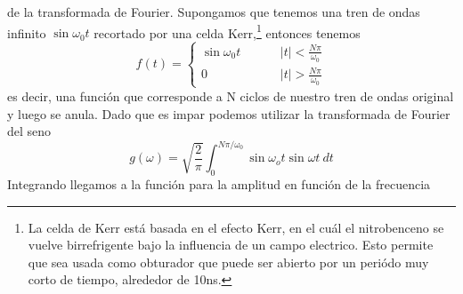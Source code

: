  de la transformada de Fourier. Supongamos que tenemos una tren de ondas infinito $\sin{\omega_0 t}$ recortado por una celda Kerr,\footnote{La celda de Kerr está basada en el efecto Kerr, en el cuál el nitrobenceno se vuelve birrefrigente bajo la influencia de un campo electrico. Esto permite que sea usada como obturador que puede ser abierto por un periódo muy corto de tiempo, alrededor de 10ns.} entonces tenemos
\begin{equation}
f(t)= \left\lbrace \begin{array}{lr}
\sin{\omega_0 t} \hspace{1cm} &|t| < \frac{N\pi}{\omega_0} \\
0 \hspace{1cm} &|t| > \frac{N\pi}{\omega_0}
\end{array} \right.
\end{equation}
es decir, una función que corresponde a N ciclos de nuestro tren de ondas original y luego se anula. Dado que es impar podemos utilizar la transformada de Fourier del seno\cite[][p.939]{arfken}
\begin{equation}
    g(\omega) = \sqrt{\frac{2}{\pi}} \int_0^{N\pi/\omega_0}\sin{\omega_o t} \sin{\omega t}~dt
\end{equation}
Integrando llegamos a la función para la amplitud en función de la frecuencia
